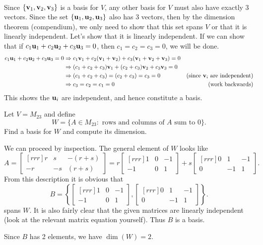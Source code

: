\\
\begin{solution}
\noindent Since $\{{\mathbf v}_1,{\mathbf v}_2,{\mathbf v}_3\}$ is a basis for $V$, any other basis for $V$ must also have exactly 3 vectors. Since the set $\{{\mathbf u}_1,{\mathbf u}_2,{\mathbf u}_3\}$ also has 3 vectors, then by the dimension theorem (compendium), we only need to show that this set spans $V$ or that it is linearly independent. Let's show that it is linearly independent. If we can show that if $c_1{\mathbf u}_1 + c_2{\mathbf u}_2 + c_3{\mathbf u}_3 = 0$,  then $c_1=c_2=c_3=0$,  we will be done.
\begin{align*}
c_1{\mathbf u}_1 + c_2{\mathbf u}_2 + c_3{\mathbf u}_3=0&\Rightarrow
c_1{\mathbf v}_1 + c_2({\mathbf v}_1+{\mathbf v}_2) + c_3({\mathbf v}_1+{\mathbf v}_2+{\mathbf v}_3)=0\\
&\Rightarrow (c_1+c_2+c_3){\mathbf v}_1 + (c_2+c_3){\mathbf v}_2 + c_3{\mathbf v}_3 = 0\\
&\Rightarrow (c_1+c_2+c_3)=(c_2+c_3)=c_3=0 &\text{(since ${\mathbf v}_i$ are independent)}\\
&\Rightarrow c_3=c_2=c_1=0 &\text{(work backwards)}
\end{align*}
This shows the ${\mathbf u}_i$ are independent, and hence constitute a basis. 
\end{solution}
\ii Let $V=M_{23}$ and define 
\[
W=\{A\in M_{23}\colon \text{ rows and columns of $A$ sum to 0}\}.
\]
Find a basis for $W$ and compute its dimension. 
\\
\begin{solution}
We can proceed by inspection. The general element of $W$ looks like
\[
A=\begin{bmatrix}[rrr]
r&s&-(r+s)\\
-r&-s&(r+s)
\end{bmatrix}=r\begin{bmatrix}[rrr]1&0&-1\\
-1&0&1
\end{bmatrix}+s\begin{bmatrix}[rrr]0&1&-1\\
0&-1&1
\end{bmatrix}.
\]
From this description it is obvious that 
\[
B=\left\{
\begin{bmatrix}[rrr]1&0&-1\\
-1&0&1
\end{bmatrix},
\begin{bmatrix}[rrr]0&1&-1\\
0&-1&1
\end{bmatrix}
\right\}.
\]
spans $W$. It is also fairly clear that the given matrices are linearly independent (look at the relevant matrix equation yourself). Thus $B$ is a basis. 

Since $B$ has 2 elements, we have $\dim(W)=2$. 
\end{solution}

